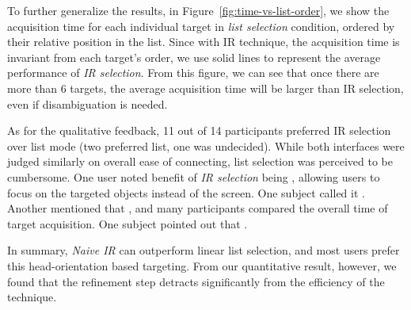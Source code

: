 To further generalize the results, in Figure~\ref{fig:time-vs-list-order}, we show the acquisition time for each individual target in {\em list selection} condition, ordered by their relative position in the list. Since with IR technique, the acquisition time is invariant from each target's order, we use solid lines to represent the average performance of {\em IR selection}. From this figure, we can see that once there are more than 6 targets, the average acquisition time will be larger than IR selection, even if disambiguation is needed. %

As for the qualitative feedback, 11 out of 14 participants preferred IR selection over list mode (two preferred list, one was undecided). While both interfaces were judged similarly on overall ease of connecting, list selection was perceived to be cumbersome. One user noted benefit of {\em IR selection} being , allowing users to focus on the targeted objects instead of the screen.  One subject called it . Another mentioned that , and many participants compared the overall time of target acquisition. One subject pointed out that .

In summary, {\em Naive IR} can outperform linear list selection, and most users prefer this head-orientation based targeting. From our quantitative result, however, we found that the refinement step detracts significantly from the efficiency of the technique.




